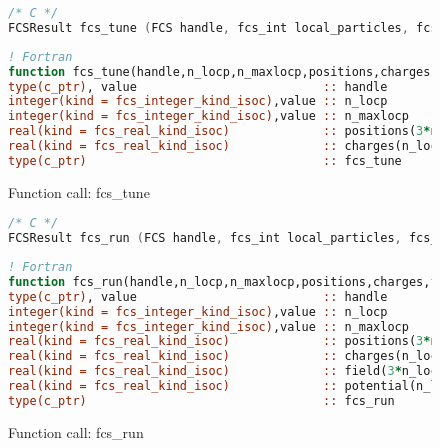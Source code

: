 \begin{figure}[htb]
\begin{lstlisting}[language=C,frame=trBL,breaklines,basicstyle=\ttfamily,prebreak={\raisebox{0ex}[0ex][0ex]{\ensuremath{\hookleftarrow}}}]
/* C */
FCSResult fcs_tune (FCS handle, fcs_int local_particles, fcs_int local_max_particles, fcs_float *positions, fcs_float *charges);
\end{lstlisting}
\begin{lstlisting}[language=Fortran,frame=trBL,breaklines,basicstyle=\ttfamily,prebreak={\raisebox{0ex}[0ex][0ex]{\ensuremath{\hookleftarrow}}}]
! Fortran
function fcs_tune(handle,n_locp,n_maxlocp,positions,charges)
type(c_ptr), value                          :: handle
integer(kind = fcs_integer_kind_isoc),value :: n_locp
integer(kind = fcs_integer_kind_isoc),value :: n_maxlocp
real(kind = fcs_real_kind_isoc)             :: positions(3*n_locp)
real(kind = fcs_real_kind_isoc)             :: charges(n_locp)
type(c_ptr)                                 :: fcs_tune
\end{lstlisting}
\caption{Function call: fcs\_tune}
\label{fig:fcs_tune}
\end{figure}
\begin{figure}[htb]
\begin{lstlisting}[language=C,frame=trBL,breaklines,basicstyle=\ttfamily,prebreak={\raisebox{0ex}[0ex][0ex]{\ensuremath{\hookleftarrow}}}]
/* C */
FCSResult fcs_run (FCS handle, fcs_int local_particles, fcs_int local_max_particles, fcs_float *positions, fcs_float *charges, fcs_float *field, fcs_float *potentials);
\end{lstlisting}
\begin{lstlisting}[language=Fortran,frame=trBL,breaklines,basicstyle=\ttfamily,prebreak={\raisebox{0ex}[0ex][0ex]{\ensuremath{\hookleftarrow}}}]
! Fortran
function fcs_run(handle,n_locp,n_maxlocp,positions,charges,field,potential)
type(c_ptr), value                          :: handle
integer(kind = fcs_integer_kind_isoc),value :: n_locp
integer(kind = fcs_integer_kind_isoc),value :: n_maxlocp
real(kind = fcs_real_kind_isoc)             :: positions(3*n_locp)
real(kind = fcs_real_kind_isoc)             :: charges(n_locp)
real(kind = fcs_real_kind_isoc)             :: field(3*n_locp)
real(kind = fcs_real_kind_isoc)             :: potential(n_locp)
type(c_ptr)                                 :: fcs_run
\end{lstlisting}
\caption{Function call: fcs\_run}
\label{fig:fcs_run}
\end{figure}
